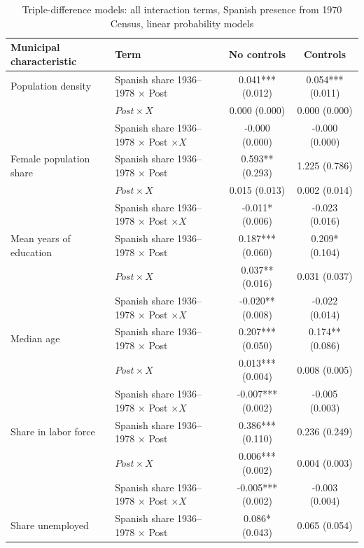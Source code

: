 \begin{table}[!htbp]
\small
\renewcommand{\arraystretch}{1}
\setlength{\tabcolsep}{3pt}
\centering
\caption{Triple-difference models: all interaction terms, Spanish presence from 1970 Census, linear probability models}
\label{tab:triple_pooled_all_c70_lpm_stata}
\captionsetup{justification=centering}
\begin{tabular}{llcc}
\hline
Municipal characteristic & Term & No controls & Controls \\
\hline
Population density & Spanish share 1936--1978 \(\times\) Post & 0.041*** (0.012) & 0.054*** (0.011) \\
 & \(Post \times X\) & 0.000 (0.000) & 0.000 (0.000) \\
 & Spanish share 1936--1978 \(\times\) Post \(\times X\) & -0.000 (0.000) & -0.000 (0.000) \\
\addlinespace
Female population share & Spanish share 1936--1978 \(\times\) Post & 0.593** (0.293) & 1.225 (0.786) \\
 & \(Post \times X\) & 0.015 (0.013) & 0.002 (0.014) \\
 & Spanish share 1936--1978 \(\times\) Post \(\times X\) & -0.011* (0.006) & -0.023 (0.016) \\
\addlinespace
Mean years of education & Spanish share 1936--1978 \(\times\) Post & 0.187*** (0.060) & 0.209* (0.104) \\
 & \(Post \times X\) & 0.037** (0.016) & 0.031 (0.037) \\
 & Spanish share 1936--1978 \(\times\) Post \(\times X\) & -0.020** (0.008) & -0.022 (0.014) \\
\addlinespace
Median age & Spanish share 1936--1978 \(\times\) Post & 0.207*** (0.050) & 0.174** (0.086) \\
 & \(Post \times X\) & 0.013*** (0.004) & 0.008 (0.005) \\
 & Spanish share 1936--1978 \(\times\) Post \(\times X\) & -0.007*** (0.002) & -0.005 (0.003) \\
\addlinespace
Share in labor force & Spanish share 1936--1978 \(\times\) Post & 0.386*** (0.110) & 0.236 (0.249) \\
 & \(Post \times X\) & 0.006*** (0.002) & 0.004 (0.003) \\
 & Spanish share 1936--1978 \(\times\) Post \(\times X\) & -0.005*** (0.002) & -0.003 (0.004) \\
\addlinespace
Share unemployed & Spanish share 1936--1978 \(\times\) Post & 0.086* (0.043) & 0.065 (0.054) \\

\end{tabular}
\end{table}
